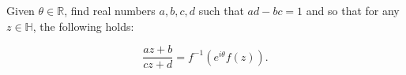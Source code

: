 Given $\theta \in \mathbb{R}$, find real numbers $a, b, c, d$ such that $ad - bc = 1$ and so that for any 
$z \in \mathbb{H}$, the following holds:

$$
\frac{az + b}{cz + d} = f^{-1} \left(e^{i \theta} f(z) \right).
$$

\begin{solution}
  \ \\
\end{solution}